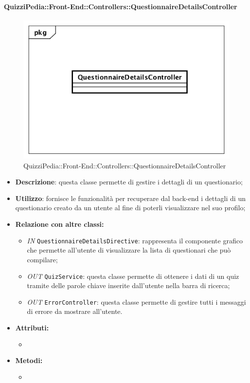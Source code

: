 \paragraph{QuizziPedia::Front-End::Controllers::QuestionnaireDetailsController}
\begin{figure}
	\centering
	\includegraphics[scale=0.45]{UML/Classi/Front-End/QuizziPedia_Front-end_Controller_QuestionnaireDetailsController.png}
	\caption{QuizziPedia::Front-End::Controllers::QuestionnaireDetailsController}
\end{figure}
\begin{itemize}
	\item \textbf{Descrizione}: questa classe permette di gestire i dettagli di un questionario; 
	\item \textbf{Utilizzo}: fornisce le funzionalità per recuperare dal back-end i dettagli di un questionario creato da un utente al fine di poterli visualizzare nel suo profilo;
	\item \textbf{Relazione con altre classi:}
	\begin{itemize}
		\item \textit{IN} \texttt{QuestionnaireDetailsDirective}: rappresenta il componente grafico che permette all'utente di visualizzare la lista di questionari che può compilare;
		\item \textit{OUT} \texttt{QuizService}: questa classe permette di ottenere i dati di un quiz tramite delle parole chiave inserite dall'utente nella barra di ricerca;
		\item \textit{OUT} \texttt{ErrorController}: questa classe permette di gestire tutti i messaggi di errore da mostrare all'utente.
	\end{itemize}
	\item \textbf{Attributi:}
	\begin{itemize}
		\item 
	\end{itemize}
	\item \textbf{Metodi:}
	\begin{itemize}
		\item 
	\end{itemize}
\end{itemize}


